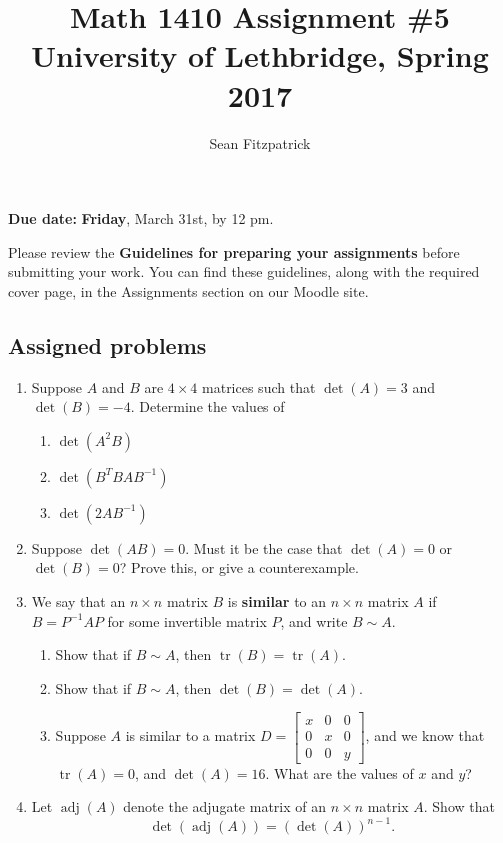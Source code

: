 \documentclass[letterpaper,12pt]{article}
\title{Math 1410 Assignment \#5\\University of Lethbridge, Spring 2017}
\author{Sean Fitzpatrick}
\newcommand{\bbm}{\begin{bmatrix}}
\newcommand{\ebm}{\end{bmatrix}}
\begin{document}
 \maketitle

{\bf Due date:} {\bf Friday}, March 31st, by 12 pm.

\bigskip

Please review the {\bf Guidelines for preparing your assignments} before submitting your work. You can find these guidelines, along with the required cover page, in the Assignments section on our Moodle site.



\subsection*{Assigned problems}
\begin{enumerate}
\item Suppose $A$ and $B$ are $4\times 4$ matrices such that $\det(A) = 3$ and $\det(B)=-4$. Determine the values of
\begin{enumerate}
 \item $\det(A^2B)$
 \item $\det(B^TBAB^{-1})$
 \item $\det(2AB^{-1})$
\end{enumerate}
\item Suppose $\det(AB)=0$. Must it be the case that $\det(A)=0$ or $\det(B)=0$? Prove this, or give a counterexample.
\item We say that an $n\times n$ matrix $B$ is \textbf{similar} to an $n\times n$ matrix $A$ if $B=P^{-1}AP$ for some invertible matrix $P$, and write $B\sim A$.
\begin{enumerate}
 \item Show that if $B\sim A$, then $\operatorname{tr}(B)=\operatorname{tr}(A)$.
 \item Show that if $B\sim A$, then $\det(B)=\det(A)$.
 \item Suppose $A$ is similar to a matrix $D = \bbm x&0&0\\0&x&0\\0&0&y\ebm$, and we know that $\operatorname{tr}(A)=0$, and $\det(A)=16$. What are the values of $x$ and $y$?
\end{enumerate}
\item Let $\operatorname{adj}(A)$ denote the adjugate matrix of an $n\times n$ matrix $A$. Show that 
\[\det(\operatorname{adj}(A)) = (\det(A))^{n-1}.\]


\end{enumerate}
\end{document}
